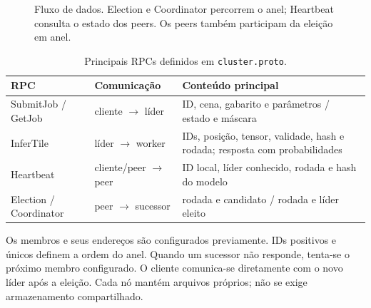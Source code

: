 \documentclass[12pt]{article}
\begin{document}
\begin{figure}[h]
\centering
{}
\caption{Fluxo de dados. Election e Coordinator percorrem o anel; Heartbeat consulta o estado dos peers. Os peers também participam da eleição em anel.}
\end{figure}

\begin{table}[h]
\centering\small
\caption{Principais RPCs definidos em \texttt{cluster.proto}.}
\begin{tabular}{@{}>{\raggedright\arraybackslash}p{2.8cm}p{3.6cm}p{7.6cm}@{}}
\toprule
RPC & Comunicação & Conteúdo principal\\\midrule
\mbox{SubmitJob} / \mbox{GetJob} & cliente $\rightarrow$ líder & ID, cena, gabarito e parâmetros / estado e máscara\\
InferTile & líder $\rightarrow$ worker & IDs, posição, tensor, validade, hash e rodada; resposta com probabilidades\\
Heartbeat & cliente/peer $\rightarrow$ peer & ID local, líder conhecido, rodada e hash do modelo\\
\mbox{Election} / \mbox{Coordinator} & peer $\rightarrow$ sucessor & rodada e candidato / rodada e líder eleito\\
\bottomrule
\end{tabular}
\end{table}

Os membros e seus endereços são configurados previamente. IDs positivos e únicos definem a ordem do anel. Quando um sucessor não responde, tenta-se o próximo membro configurado. O cliente comunica-se diretamente com o novo líder após a eleição. Cada nó mantém arquivos próprios; não se exige armazenamento compartilhado.
\end{document}
